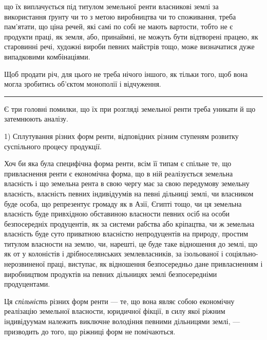 \parcont{}  %
що їх виплачується під титулом земельної ренти власникові землі за використання
ґрунту чи то з метою виробництва чи то споживання, треба пам’ятати, що
ціна речей, які самі по собі не мають вартости, тобто не є продукти праці, як
земля, або, принаймні, не можуть бути відтворені працею, як старовинні речі,
художні вироби певних майстрів тощо, може визначатися дуже випадковими
комбінаціями.

Щоб продати річ, для цього не треба нічого іншого, як тільки того, щоб
вона могла зробитись об’єктом монополії і відчуження.

\pfbreak{} %

Є три головні помилки, що їх при розгляді земельної ренти треба уникати
й що затемнюють аналізу.

1) Сплутування різних форм ренти, відповідних різним ступеням розвитку
суспільного процесу продукції.

Хоч би яка була специфічна форма ренти, всім її типам є спільне те, що привласнення
ренти є економічна форма, що в ній реалізується земельна власність і що
земельна рента в свою чергу має за свою передумову земельну власність, власність
певних індивідуумів на певні дільниці землі, чи власником буде особа, що репрезентує
громаду як в Азії, Єгипті тощо, чи ця земельна власність буде привхідною
обставиною власности певних осіб на особи безпосередніх продуцентів, як за системи
рабства або кріпацтва, чи ж земельна власність буде суто приватною
власністю непродуцентів на природу, простим титулом власности на землю, чи,
нарешті, це буде таке відношення до землі, що як от у колоністів і дрібноселянських
землевласників, за ізольованої і соціяльно-нерозвиненої праці, виступає,
як відношення безпосередньо дане привласненням і виробництвом продуктів
на певних дільницях землі безпосередніми продуцентами.

Ця \emph{спільність} різних форм ренти — те, що вона являє собою економічну
реалізацію земельної власности, юридичної фікції, в силу якої ріжним індивідуумам
належить виключне володіння певними дільницями землі, — призводить до
того, що ріжниці форм не помічаються.

